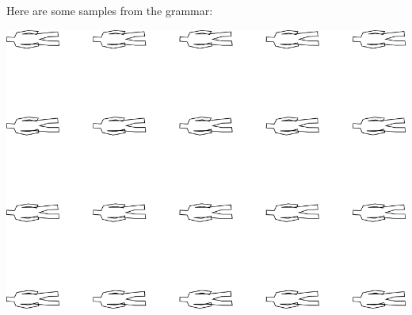 Here are some samples from the grammar:

\includegraphics[width=6in]{output/3.learning/incremental/gram.0.d/samples.png}


